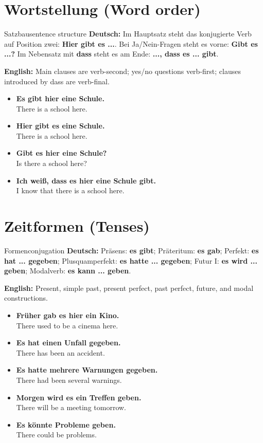 \documentclass[a4paper,11pt]{article}
\newcommand{\GermanText}[1]{\textbf{Deutsch: }#1\par}
\newcommand{\EnglishText}[1]{{\small\color{SoftGray}\textbf{English: }#1\par}}
\newcommand{\ExampleItem}[2]{\item \textbf{#1}\\{\small\color{SoftGray}#2}}
\begin{document}
   \section{Wortstellung (Word order)}
            \begin{grammarentry}{Satzbau}{sentence structure}
               \GermanText{Im Hauptsatz steht das konjugierte Verb auf Position zwei: \textbf{Hier gibt es ...}. Bei Ja/Nein-Fragen steht es vorne: \textbf{Gibt es ...?} Im Nebensatz mit \textbf{dass} steht es am Ende: \textbf{..., dass es ... gibt}.}
               \EnglishText{Main clauses are verb-second; yes/no questions verb-first; clauses introduced by dass are verb-final.}
            \end{grammarentry}
            \begin{exbox}\begin{itemize}
               \ExampleItem{Es gibt hier eine Schule.}{There is a school here.}
               \ExampleItem{Hier gibt es eine Schule.}{There is a school here.}
               \ExampleItem{Gibt es hier eine Schule?}{Is there a school here?}
               \ExampleItem{Ich weiß, dass es hier eine Schule gibt.}{I know that there is a school here.}
               \end{itemize}\end{exbox}
   \section{Zeitformen (Tenses)}
               \begin{grammarentry}{Formen}{conjugation}
                  \GermanText{Präsens: \textbf{es gibt}; Präteritum: \textbf{es gab}; Perfekt: \textbf{es hat ... gegeben}; Plusquamperfekt: \textbf{es hatte ... gegeben}; Futur I: \textbf{es wird ... geben}; Modalverb: \textbf{es kann ... geben}.}
                  \EnglishText{Present, simple past, present perfect, past perfect, future, and modal constructions.}
               \end{grammarentry}
               \begin{exbox}\begin{itemize}
                  \ExampleItem{Früher gab es hier ein Kino.}{There used to be a cinema here.}
                  \ExampleItem{Es hat einen Unfall gegeben.}{There has been an accident.}
                  \ExampleItem{Es hatte mehrere Warnungen gegeben.}{There had been several warnings.}
                  \ExampleItem{Morgen wird es ein Treffen geben.}{There will be a meeting tomorrow.}
                  \ExampleItem{Es könnte Probleme geben.}{There could be problems.}
                  \end{itemize}\end{exbox}
\end{document}
